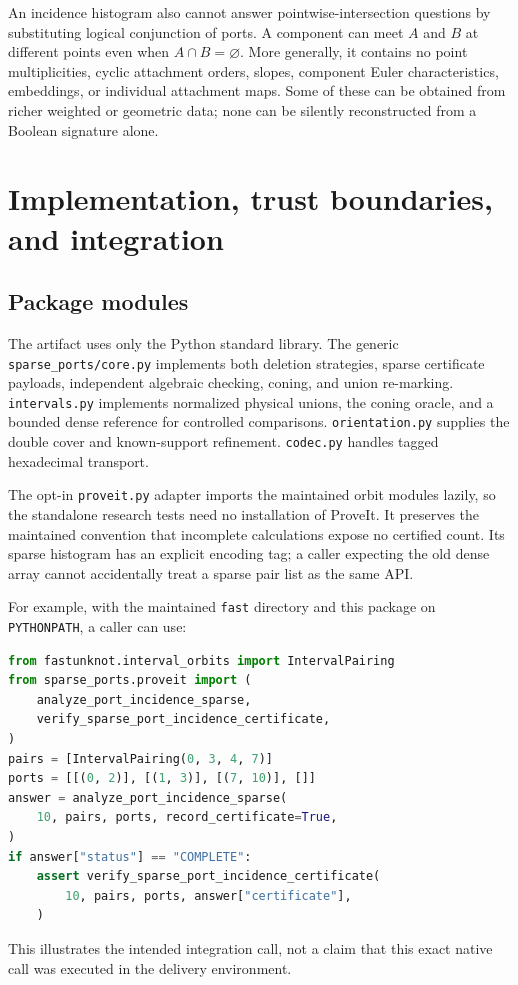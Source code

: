 \documentclass[11pt]{article}
\theoremstyle{definition}
\begin{document}
An incidence histogram also cannot answer pointwise-intersection questions
by substituting logical conjunction of ports. A component can meet $A$ and
$B$ at different points even when $A\cap B=\varnothing$. More generally,
it contains no point multiplicities, cyclic attachment orders, slopes,
component Euler characteristics, embeddings, or individual attachment maps.
Some of these can be obtained from richer weighted or geometric data;
none can be silently reconstructed from a Boolean signature alone.

\section{Implementation, trust boundaries, and integration}
\label{sec:implementation}

\subsection{Package modules}
The artifact uses only the Python standard library. The generic
\texttt{sparse\_ports/core.py} implements both deletion strategies, sparse
certificate payloads, independent algebraic checking, coning, and union
re-marking. \texttt{intervals.py} implements normalized physical unions,
the coning oracle, and a bounded dense reference for controlled comparisons.
\texttt{orientation.py} supplies the double cover and known-support
refinement. \texttt{codec.py} handles tagged hexadecimal transport.

The opt-in \texttt{proveit.py} adapter imports the maintained orbit modules
lazily, so the standalone research tests need no installation of ProveIt.
It preserves the maintained convention that incomplete calculations expose
no certified count. Its sparse histogram has an explicit encoding tag;
a caller expecting the old dense array cannot accidentally treat a sparse
pair list as the same API.

For example, with the maintained \texttt{fast} directory and this package
on \texttt{PYTHONPATH}, a caller can use:
\noindent\begin{minipage}{\linewidth}
\begin{lstlisting}[language=Python]
from fastunknot.interval_orbits import IntervalPairing
from sparse_ports.proveit import (
    analyze_port_incidence_sparse,
    verify_sparse_port_incidence_certificate,
)
pairs = [IntervalPairing(0, 3, 4, 7)]
ports = [[(0, 2)], [(1, 3)], [(7, 10)], []]
answer = analyze_port_incidence_sparse(
    10, pairs, ports, record_certificate=True,
)
if answer["status"] == "COMPLETE":
    assert verify_sparse_port_incidence_certificate(
        10, pairs, ports, answer["certificate"],
    )
\end{lstlisting}
\end{minipage}
This illustrates the intended integration call, not a claim that this
exact native call was executed in the delivery environment.
\end{document}
